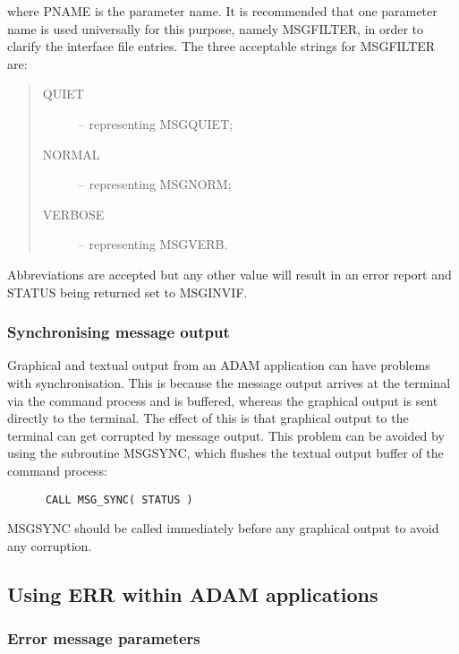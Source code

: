 \documentclass[twoside,11pt]{article}
\newcommand{\xlabel}[1]{}
\renewcommand{\_}{\texttt{\symbol{95}}}
\begin{document}
where PNAME is the parameter name.
It is recommended that one parameter name is used universally for this purpose,
namely MSG\_FILTER, in order to clarify the interface file entries.
The three acceptable strings for MSG\_FILTER are:

\begin {quote}
\begin {description}
\item [QUIET] -- representing MSG\_\_QUIET;
\item [NORMAL] -- representing MSG\_\_NORM;
\item [VERBOSE] -- representing MSG\_\_VERB.
\end {description}
\end {quote}
Abbreviations are accepted but
any other value will result in an error report and STATUS being
returned set to MSG\_\_INVIF.


\subsubsection{\xlabel{synchronising_message_output}Synchronising message output}

Graphical and textual output from an ADAM application can have problems with
synchronisation.
This is because the message output arrives at the terminal via the command
process and is buffered, whereas the graphical output is sent directly to the
terminal.
The effect of this is that graphical output to the terminal can get corrupted by
message output.
This problem can be avoided by using the subroutine MSG\_SYNC, which flushes
the textual output buffer of the command process:

\begin {small}
\begin{verbatim}
      CALL MSG_SYNC( STATUS )
\end{verbatim}
\end {small}

MSG\_SYNC should be called immediately before any graphical output to avoid any
corruption. 


\subsection{\xlabel{using_err_within_adam_applications}Using ERR within ADAM applications \label{adam_err}}

\subsubsection{\xlabel{error_message_parameters}Error message parameters}
\end{document}
